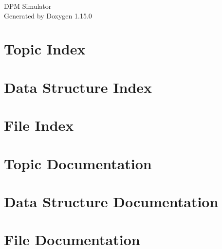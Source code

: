 \documentclass[twoside]{book}
\newcommand{\+}{\discretionary{\mbox{\scriptsize$\hookleftarrow$}}{}{}}
\newcommand{\clearemptydoublepage}{%
    \newpage{\pagestyle{empty}\cleardoublepage}%
  }
\begin{document}
  \raggedbottom
    \hypersetup{pageanchor=false,
                bookmarksnumbered=true,
                pdfencoding=unicode
               }
  \begin{titlepage}
  \vspace*{7cm}
  \begin{center}%
  {\Large DPM Simulator}\\
  \vspace*{1cm}
  {\large Generated by Doxygen 1.15.0}\\
  \end{center}
  \end{titlepage}
  \clearemptydoublepage
  \tableofcontents
  \clearemptydoublepage
  \hypersetup{pageanchor=true}
\chapter{Topic Index}

\chapter{Data Structure Index}

\chapter{File Index}

\chapter{Topic Documentation}






\chapter{Data Structure Documentation}




\chapter{File Documentation}






  \backmatter
  \newpage
  \clearemptydoublepage
  \printindex
\end{document}
